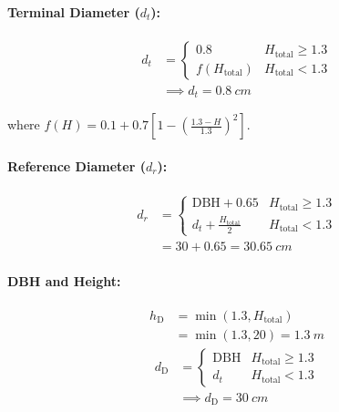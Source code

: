 \documentclass[twocolumn, bibliography=totoc]{scrartcl}
\begin{document}
\paragraph{Terminal Diameter ($d_t$):}
\begin{equation}
\begin{aligned}
  d_t &= \begin{cases} 
    0.8 & H_{\text{total}} \geq 1.3 \\ 
    f(H_{\text{total}}) & H_{\text{total}} < 1.3 
  \end{cases} \\
  &\implies d_t = \qty{0.8}{cm}
\end{aligned}
\end{equation}
\begin{footnotesize}
where $f(H) = 0.1 + 0.7 [ 1 - ( \frac{1.3 - H}{1.3} )^2 ]$.
\end{footnotesize}

\paragraph{Reference Diameter ($d_r$):}
\begin{equation}
\begin{aligned}
  d_r &= \begin{cases} 
    \text{DBH} + 0.65 & H_{\text{total}} \geq 1.3 \\ 
    d_t + \frac{H_{\text{total}}}{2} & H_{\text{total}} < 1.3 
  \end{cases} \\
  &= 30 + 0.65 = \qty{30.65}{cm}
\end{aligned}
\end{equation}

\paragraph{DBH and Height:}
\begin{equation}
\begin{aligned}
  h_{\text{D}} &= \min(1.3, H_{\text{total}}) \\
  &= \min(1.3, 20) = \qty{1.3}{m}
\end{aligned}
\end{equation}
\begin{equation}
\begin{aligned}
  d_{\text{D}} &= \begin{cases} 
    \text{DBH} & H_{\text{total}} \geq 1.3 \\ 
    d_t & H_{\text{total}} < 1.3 
  \end{cases} \\
  &\implies d_{\text{D}} = \qty{30}{cm}
\end{aligned}
\end{equation}
\end{document}
